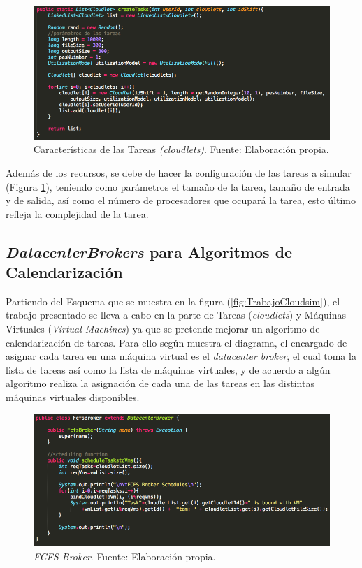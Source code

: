 \setcounter{figure}{11}
\renewcommand\thefigure{\arabic{figure}}
\begin{figure}[h!]
	\centering
	\includegraphics[scale=0.5]{media/creacion_cloudlet}
	\caption{Características de las Tareas \textit{(cloudlets)}. Fuente: Elaboración propia.}
	\label{fig:TCar}
\end{figure} 





Adem\'as de los recursos, se debe de hacer la configuraci\'on de las tareas a simular (Figura \ref{fig:TCar}), teniendo como par\'ametros el tamaño de la tarea, tamaño de entrada y de salida, as\'i como el número de procesadores que ocupar\'a la tarea, esto \'ultimo refleja la complejidad de la tarea.

\subsection*{\textit{DatacenterBrokers} para Algoritmos de Calendarización}

Partiendo del Esquema que se muestra en la figura (\ref{fig:TrabajoCloudsim}), el trabajo presentado se lleva a cabo en la parte de Tareas (\textit{cloudlets}) y M\'aquinas Virtuales (\textit{Virtual Machines}) ya que se pretende mejorar un algoritmo de calendarizaci\'on de tareas.
Para ello seg\'un muestra el diagrama, el encargado de asignar cada tarea en una m\'aquina virtual es el \textit{datacenter broker}, el cual toma la lista de tareas as\'i como la lista de m\'aquinas virtuales, y de acuerdo a alg\'un algoritmo realiza la asignaci\'on de cada una de las tareas en las distintas m\'aquinas virtuales disponibles.

\setcounter{figure}{12}
\renewcommand\thefigure{\arabic{figure}}
\begin{figure}[h!]
	\centering
	\includegraphics[scale=0.5]{media/FCFS_broker}
	\caption{\textit{FCFS Broker}. Fuente: Elaboración propia.}
	\label{fig:fcfsBroker}
\end{figure}

